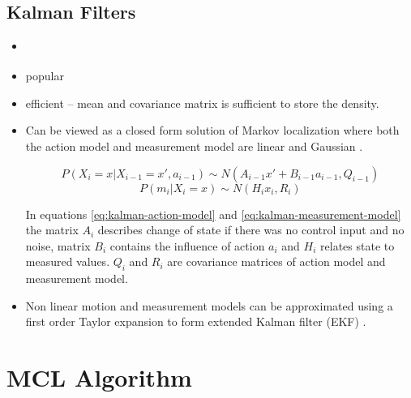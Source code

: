 

\subsection{Kalman Filters}
\label{sec:kalman}

\begin{itemize}
\item \cite{kalman60,welch95}
\item popular
\item efficient -- mean and covariance matrix is sufficient to store the density.
\item Can be viewed as a closed form solution of Markov localization where both the
	action model and measurement model are linear and Gaussian \cite{diard}.

	\begin{equation}
	\label{eq:kalman-action-model}
	P(X_i = x | X_{i-1} = x', a_{i - 1}) \sim N(A_{i - 1}x' + B_{i - 1}a_{i - 1}, Q_{i - 1})
	\end{equation}
	\begin{equation}
	\label{eq:kalman-measurement-model}
	P(m_{i} | X_i = x) \sim N(H_{i}x_{i}, R_i)
	\end{equation}
	
	In equations \eqref{eq:kalman-action-model} and \eqref{eq:kalman-measurement-model}
	the matrix \(A_i\) describes change of state if there was no control input and no noise,
	matrix \(B_i\) contains the influence of action \(a_i\) and \(H_i\) relates state to measured
	values.
	\(Q_i\) and \(R_i\) are covariance matrices of action model and measurement model.

\item Non linear motion and measurement models can be approximated 
	using a first order Taylor expansion to form extended Kalman
	filter (EKF) \cite{welch95}.
\end{itemize}

\section{MCL Algorithm}
\label{sec:mcl-algorithm}

